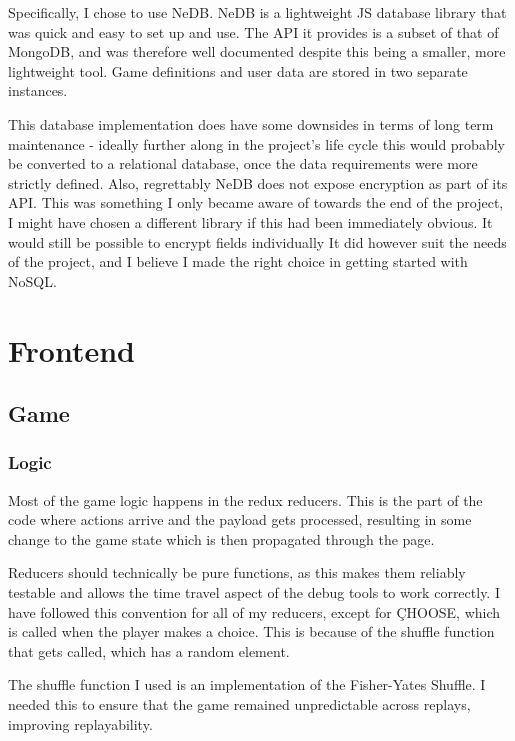 Specifically, I chose to use NeDB\cite{NeDB}. NeDB is a lightweight JS database library that was quick and easy to set up and use. The API it provides is a subset of that of MongoDB\cite{MongoDB}, and was therefore well documented despite this being a smaller, more lightweight tool. Game definitions and user data are stored in two separate instances.

This database implementation does have some downsides in terms of long term maintenance - ideally further along in the project's life cycle this would probably be converted to a relational database, once the data requirements were more strictly defined. Also, regrettably NeDB does not expose encryption as part of its API.
This was something I only became aware of towards the end of the project, I might have chosen a different library if this had been immediately obvious. It would still be possible to encrypt fields individually
It did however suit the needs of the project, and I believe I made the right choice in getting started with NoSQL.

\section{Frontend}

\subsection{Game}

\subsubsection{Logic}
Most of the game logic happens in the redux reducers. 
This is the part of the code where actions arrive and the payload gets processed, resulting in some change to the game state which is then propagated through the page.

Reducers should technically be pure functions, as this makes them reliably testable and allows the time travel aspect of the debug tools to work correctly. 
I have followed this convention for all of my reducers, except for \c{CHOOSE}, which is called when the player makes a choice. 
This is because of the shuffle function that gets called, which has a random element.

The shuffle function I used is an implementation of the Fisher-Yates Shuffle\cite{Shuffle}. 
I needed this to ensure that the game remained unpredictable across replays, improving replayability.

